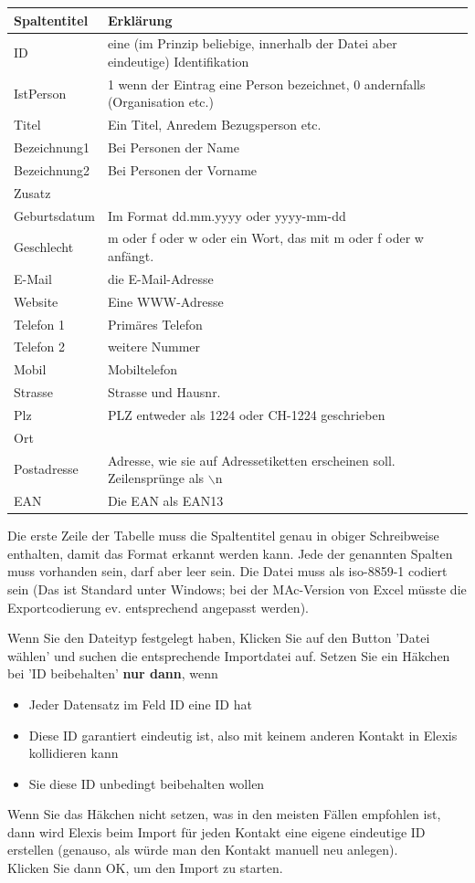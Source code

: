 \begin{tabular}[h]{|l|l|}
\hline Spaltentitel & Erklärung\\
\hline
\hline  ID & eine (im Prinzip beliebige, innerhalb der Datei aber eindeutige) Identifikation\\
\hline IstPerson & 1 wenn der Eintrag eine Person bezeichnet, 0 andernfalls (Organisation etc.)\\
\hline Titel & Ein Titel, Anredem Bezugsperson etc.\\
\hline Bezeichnung1 & Bei Personen der Name\\
\hline Bezeichnung2 & Bei Personen der Vorname\\
\hline Zusatz & \\
\hline Geburtsdatum & Im Format dd.mm.yyyy oder yyyy-mm-dd\\
\hline Geschlecht & m oder f oder w oder ein Wort, das mit m oder f oder w anfängt.\\
\hline E-Mail & die E-Mail-Adresse\\
\hline Website & Eine WWW-Adresse\\
\hline Telefon 1 & Primäres Telefon\\
\hline Telefon 2 & weitere Nummer\\
\hline Mobil & Mobiltelefon\\
\hline Strasse & Strasse und Hausnr.\\
\hline Plz & PLZ entweder als 1224 oder CH-1224 geschrieben\\
\hline Ort & \\
\hline Postadresse & Adresse, wie sie auf Adressetiketten erscheinen soll. Zeilensprünge als $\backslash$n\\
\hline EAN & Die EAN als EAN13\\
\hline
\end{tabular}

\medskip

Die erste Zeile der Tabelle muss die Spaltentitel genau in obiger Schreibweise enthalten, damit das Format erkannt werden kann.
Jede der genannten Spalten muss vorhanden sein, darf aber leer sein. Die Datei muss als iso-8859-1 codiert sein (Das ist Standard unter Windows; bei der MAc-Version von Excel müsste die Exportcodierung ev. entsprechend angepasst werden).

\medskip

Wenn Sie den Dateityp festgelegt haben, Klicken Sie auf den Button 'Datei wählen' und suchen die entsprechende Importdatei auf. Setzen Sie ein Häkchen bei 'ID beibehalten' \textbf{nur dann}, wenn \begin{itemize}
\item Jeder Datensatz im Feld ID eine ID hat
\item Diese ID garantiert eindeutig ist, also mit keinem anderen Kontakt in Elexis kollidieren kann
\item Sie diese ID unbedingt beibehalten wollen
\end{itemize}
Wenn Sie das Häkchen nicht setzen, was in den meisten Fällen empfohlen ist, dann wird Elexis beim Import für jeden Kontakt eine eigene eindeutige ID erstellen (genauso, als würde man den Kontakt manuell neu anlegen).\\
Klicken Sie dann OK, um den Import zu starten.

